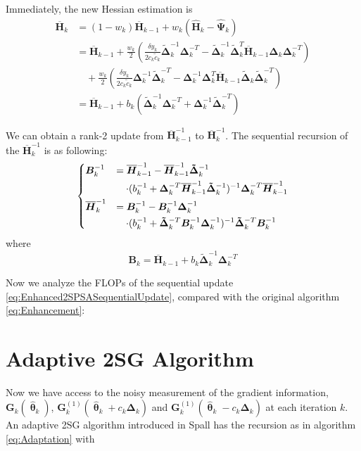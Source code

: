 \documentclass[conference]{IEEEtran}
\newcommand{\bG}{\bm{G}}
\newcommand{\bDelta}{\bm{\Delta}}
\newcommand{\oH}{\bm{\overline{H}}}
\newcommand{\hH}{\bm{\hat{H}}}
\newcommand{\hPsi}{\bm{\hat{\Psi}}}
\newcommand{\htheta}{\bm{\hat{\uptheta}}}
\newcommand{\tDelta}{\bm{\tilde{\Delta}}}
\begin{document}
Immediately, the new Hessian estimation is
\begin{align*}
\oH_k&=(1-w_k)\oH_{k-1}+w_k(\hH_k-\hPsi_k)\\
&=\oH_{k-1}+\frac{w_k}{2}(\frac{\delta y_k}{2c_k\tilde{c}_k}\tDelta_k^{-1}\bDelta_k^{-T}-\tDelta_k^{-1}\tDelta_k^{T}\oH_{k-1}\bDelta_k\bDelta_k^{-T})\\
&\quad +\frac{w_k}{2}(\frac{\delta y_k}{2c_k\tilde{c}_k}\bDelta_k^{-1}\tDelta_k^{-T}-\bDelta_k^{-1}\bDelta_k^{T}\oH_{k-1}\tDelta_k\tDelta_k^{-T})\\
&=\oH_{k-1}+b_k(\tDelta_k^{-1}\bDelta_k^{-T}+\bDelta_k^{-1}\tDelta_k^{-T})
\end{align*}

We can obtain a rank-2 update from $ \oH_{k-1}^{-1} $ to $ \oH_{k}^{-1} $. The sequential recursion of the $ \oH_k^{-1} $ is as following:
\begin{equation} \label{eq:Enhanced2SPSASequentialUpdate}
\begin{dcases}
	\bm{B}_k^{-1}
	&=\oH_{k-1}^{-1}-\oH_{k-1}^{-1}\tDelta_k^{-1}\\
	&~~~\cdot(b_k^{-1}+\bDelta_k^{-T}\oH_{k-1}^{-1}\tDelta_k^{-1})^{-1}\bDelta_k^{-T}\oH_{k-1}^{-1}\\%
    \oH_k^{-1}
    &=\bm{B}_k^{-1}-\bm{B}_k^{-1}\bDelta_k^{-1}\\
    &~~~\cdot(b_k^{-1}+\tDelta_k^{-T}\bm{B}_k^{-1}\bDelta_k^{-1})^{-1}\tDelta_k^{-T}\bm{B}_k^{-1}
\end{dcases}
\end{equation}
where
\begin{equation} \label{eq:Enhanced2SPSAB}
\bm{B}_k=\oH_{k-1}+b_k\tDelta_k^{-1}\bDelta_k^{-T}
\end{equation}

Now we analyze the FLOPs of the sequential update \ref{eq:Enhanced2SPSASequentialUpdate}, compared with the original algorithm \ref{eq:Enhancement}:







\section{Adaptive 2SG Algorithm} \label{2SG}
Now we have access to the noisy measurement of the gradient information, $\bG_k(\htheta_k)$, $\bG_k^{(1)}(\htheta_k+ c_k\bDelta_k)$ and $\bG_k^{(1)}(\htheta_k- c_k\bDelta_k)$ at each iteration $k$. An adaptive 2SG algorithm introduced in Spall \cite{Spall2000} has the recursion as in algorithm \ref{eq:Adaptation} with
\end{document}
